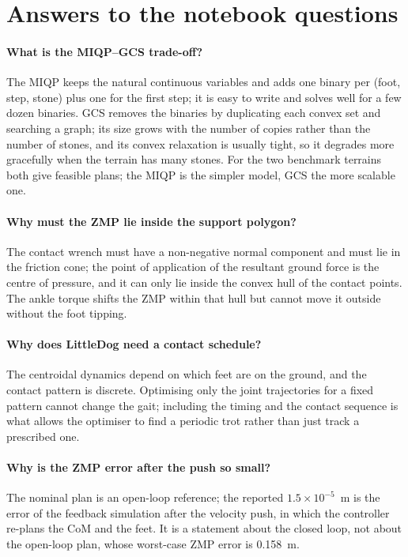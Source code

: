 \documentclass[11pt]{report}
\begin{document}
\section{Answers to the notebook questions}

\paragraph{What is the MIQP--GCS trade-off?}  The MIQP keeps the natural
continuous variables and adds one binary per (foot, step, stone) plus one for
the first step; it is easy to write and solves well for a few dozen binaries.
GCS removes the binaries by duplicating each convex set and searching a graph;
its size grows with the number of copies rather than the number of stones, and
its convex relaxation is usually tight, so it degrades more gracefully when the
terrain has many stones.  For the two benchmark terrains both give feasible
plans; the MIQP is the simpler model, GCS the more scalable one.

\paragraph{Why must the ZMP lie inside the support polygon?}  The contact
wrench must have a non-negative normal component and must lie in the friction
cone; the point of application of the resultant ground force is the centre of
pressure, and it can only lie inside the convex hull of the contact points.
The ankle torque shifts the ZMP within that hull but cannot move it outside
without the foot tipping.

\paragraph{Why does LittleDog need a contact schedule?}  The centroidal
dynamics depend on which feet are on the ground, and the contact pattern is
discrete.  Optimising only the joint trajectories for a fixed pattern cannot
change the gait; including the timing and the contact sequence is what allows
the optimiser to find a periodic trot rather than just track a prescribed one.

\paragraph{Why is the ZMP error after the push so small?}  The nominal plan is
an open-loop reference; the reported $1.5\times10^{-5}$~m is the error of the
feedback simulation after the velocity push, in which the controller re-plans
the CoM and the feet.  It is a statement about the closed loop, not about the
open-loop plan, whose worst-case ZMP error is 0.158~m.
\end{document}
